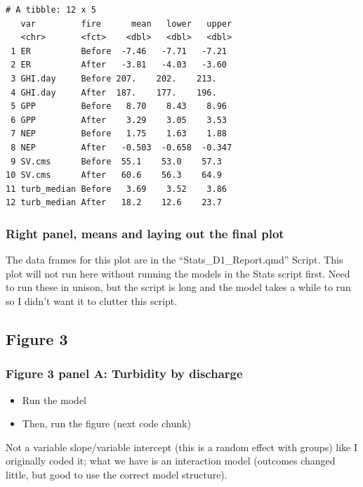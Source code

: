 \documentclass[
  letterpaper,
  DIV=11,
  numbers=noendperiod]{scrartcl}
\providecommand{\tightlist}{%
  \setlength{\itemsep}{0pt}\setlength{\parskip}{0pt}}\usepackage{longtable,booktabs,array}
\begin{document}
\small

\begin{verbatim}
# A tibble: 12 x 5
   var         fire      mean   lower   upper
   <chr>       <fct>    <dbl>   <dbl>   <dbl>
 1 ER          Before  -7.46   -7.71   -7.21 
 2 ER          After   -3.81   -4.03   -3.60 
 3 GHI.day     Before 207.    202.    213.   
 4 GHI.day     After  187.    177.    196.   
 5 GPP         Before   8.70    8.43    8.96 
 6 GPP         After    3.29    3.05    3.53 
 7 NEP         Before   1.75    1.63    1.88 
 8 NEP         After   -0.503  -0.658  -0.347
 9 SV.cms      Before  55.1    53.0    57.3  
10 SV.cms      After   60.6    56.3    64.9  
11 turb_median Before   3.69    3.52    3.86 
12 turb_median After   18.2    12.6    23.7  
\end{verbatim}

\normalsize

\subsubsection{Right panel, means and laying out the final
plot}\label{right-panel-means-and-laying-out-the-final-plot}

The data frames for this plot are in the ``Stats\_D1\_Report.qmd''
Script. This plot will not run here without running the models in the
Stats script first. Need to run these in unison, but the script is long
and the model takes a while to run so I didn't want it to clutter this
script.

\small

\normalsize

\subsection{Figure 3}\label{figure-3}

\subsubsection{Figure 3 panel A: Turbidity by
discharge}\label{figure-3-panel-a-turbidity-by-discharge}

\begin{itemize}
\tightlist
\item
  Run the model
\item
  Then, run the figure (next code chunk)
\end{itemize}

Not a variable slope/variable intercept (this is a random effect with
groups) like I originally coded it; what we have is an interaction model
(outcomes changed little, but good to use the correct model structure).
\end{document}

